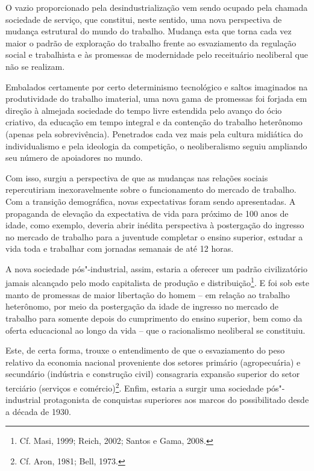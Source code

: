 O vazio proporcionado pela desindustrialização vem sendo ocupado pela
chamada sociedade de serviço, que constitui, neste sentido, uma nova
perspectiva de mudança estrutural do mundo do trabalho. Mudança esta que
torna cada vez maior o padrão de exploração do trabalho frente ao
esvaziamento da regulação social e trabalhista e às promessas de
modernidade pelo receituário neoliberal que não se realizam.

Embalados certamente por certo determinismo tecnológico e saltos
imaginados na produtividade do trabalho imaterial, uma nova gama de
promessas foi forjada em direção à almejada sociedade do tempo livre
estendida pelo avanço do ócio criativo, da educação em tempo integral e da
contenção do trabalho heterônomo (apenas pela sobrevivência). Penetrados
cada vez mais pela cultura midiática do individualismo e pela ideologia
da competição, o neoliberalismo seguiu ampliando seu número de
apoiadores no mundo.

Com isso, surgiu a perspectiva de que as mudanças nas relações sociais
repercutiriam inexoravelmente sobre o funcionamento do mercado de
trabalho. Com a transição demográfica, novas expectativas foram sendo
apresentadas. A propaganda de elevação da expectativa de vida para
próximo de 100 anos de idade, como exemplo, deveria abrir inédita
perspectiva à postergação do ingresso no mercado de trabalho para a
juventude completar o ensino superior, estudar a vida toda e trabalhar
com jornadas semanais de até 12 horas.

A nova sociedade pós"-industrial, assim, estaria a oferecer um padrão
civilizatório jamais alcançado pelo modo capitalista de produção e
distribuição\footnote{Cf. Masi, 1999; Reich, 2002; Santos e Gama, 2008.}. E foi sob este
manto de promessas de maior libertação do homem -- em relação ao
trabalho heterônomo, por meio da postergação da idade de
ingresso no mercado de trabalho para somente depois do cumprimento do
ensino superior, bem como da oferta educacional ao longo da vida -- que o
racionalismo neoliberal se constituiu.

Este, de certa forma, trouxe o entendimento de que o esvaziamento do peso
relativo da economia nacional proveniente dos setores primário
(agropecuária) e secundário (indústria e construção civil) consagraria
expansão superior do setor terciário (serviços e comércio)\footnote{Cf. Aron, 1981;
Bell, 1973.}. Enfim, estaria a surgir uma sociedade pós"-industrial
protagonista de conquistas superiores aos marcos do possibilitado desde
a década de 1930.

